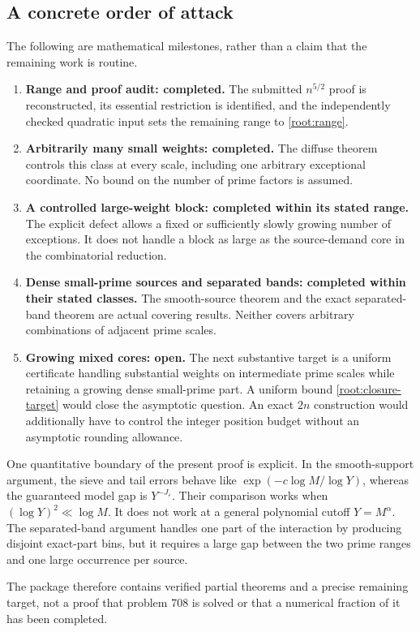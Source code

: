 \subsection{A concrete order of attack}

The following are mathematical milestones, rather than a claim
that the remaining work is routine.

\begin{enumerate}
\item \textbf{Range and proof audit: completed.} The submitted
\(n^{5/2}\) proof is reconstructed, its essential restriction is
identified, and the independently checked quadratic input sets the
remaining range to \eqref{root:range}.
\item \textbf{Arbitrarily many small weights: completed.} The
diffuse theorem controls this class at every scale, including one
arbitrary exceptional coordinate. No bound on the number of prime
factors is assumed.
\item \textbf{A controlled large-weight block: completed within
its stated range.} The explicit defect allows a fixed or sufficiently
slowly growing number of exceptions. It does not handle a block as
large as the source-demand core in the combinatorial reduction.
\item \textbf{Dense small-prime sources and separated bands:
completed within their stated classes.} The smooth-source theorem
and the exact separated-band theorem are actual covering results.
Neither covers arbitrary combinations of adjacent prime scales.
\item \textbf{Growing mixed cores: open.} The next substantive
target is a uniform certificate handling substantial weights on
intermediate prime scales while retaining a growing dense small-prime
part. A uniform bound \eqref{root:closure-target} would close the
asymptotic question. An exact \(2n\) construction would additionally
have to control the integer position budget without an asymptotic
rounding allowance.
\end{enumerate}

One quantitative boundary of the present proof is explicit. In the
smooth-support argument, the sieve and tail errors behave like
\(\exp(-c\log M/\log Y)\), whereas the guaranteed model gap is
\(Y^{-J_\varepsilon}\). Their comparison works when
\((\log Y)^2\ll\log M\). It does not work at a general polynomial
cutoff \(Y=M^\alpha\). The separated-band argument handles one
part of the interaction by producing disjoint exact-part bins, but
it requires a large gap between the two prime ranges and one large
occurrence per source.

The package therefore contains verified partial theorems and a
precise remaining target, not a proof that problem 708 is solved or
that a numerical fraction of it has been completed.
